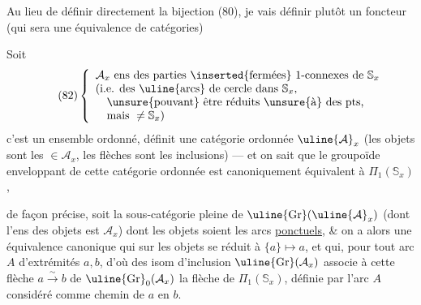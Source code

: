 Au lieu de définir directement la bijection (80), je vais définir plutôt un foncteur (qui sera une équivalence de catégories)

Soit 
\[
\tag{82}
\left\{
\begin{array}{l}
\mathcal A_x\text{ ens des parties }\inserted{\text{fermées}}\text{ }1\text{-connexes de }\mathbb S_x\\
(\text{i.e. des }\uline{\text{arcs}}\text{ de cercle dans }\mathbb S_x,\\
\quad\unsure{\text{pouvant}}\text{ être réduits }\unsure{\text{à}}\text{ des pts,}\\
\quad\text{mais }\ne\mathbb S_x)
\end{array}
\right.
\]
c'est un ensemble ordonné,   définit une catégorie ordonnée $\uline{\mathcal A}_x$ (les objets sont les $\in\mathcal A_x$, les flèches sont les inclusions) --- et on sait que le groupoïde enveloppant  de cette catégorie ordonnée est canoniquement équivalent à $\Pi_1(\mathbb S_x)$,



de façon précise, soit  la sous-catégorie pleine de $\uline{\mathrm{Gr}}(\uline{\mathcal A}_x)$ (dont l'ens des objets est $\mathcal A_x$) dont les objets soient les arcs \uline{ponctuels}, \& on a alors une équivalence canonique
qui sur les objets se réduit à $\{a\}\longmapsto a$, et qui, pour tout arc  $A$ d'extrémités $a,b$, d'où des isom d'inclusion  $\uline{\mathrm{Gr}}(\mathcal A_x)$
associe à cette flèche $a\overset{\sim}{\longrightarrow}b$ de $\uline{\mathrm{Gr}}_0(\mathcal A_x)$ la flèche de $\Pi_1(\mathbb S_x)$, définie par l'arc $A$ considéré comme chemin de $a$ en $b$.

